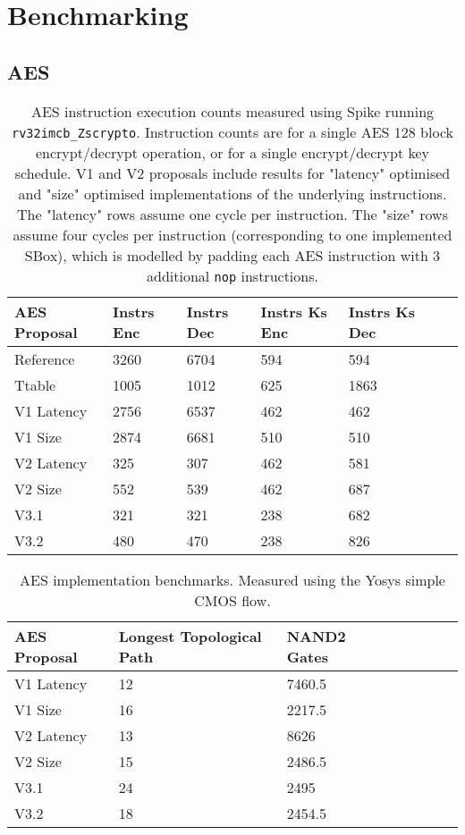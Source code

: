 
\section{Benchmarking}

\subsection{AES}
\label{sec:benchmark:aes}

\begin{table}[h]
\centering
\begin{tabular}{lllllll}
AES Proposal & Instrs Enc & Instrs Dec & Instrs Ks Enc & Instrs Ks Dec \\ \hline
Reference   & 3260  & 6704  & 594  &  594    \\
Ttable      & 1005  & 1012  & 625  &  1863   \\
V1 Latency  & 2756  & 6537  & 462  &  462    \\
V1 Size     & 2874  & 6681  & 510  &  510    \\
V2 Latency  & 325   & 307   & 462  &  581    \\
V2 Size     & 552   & 539   & 462  &  687    \\
V3.1        & 321   & 321   & 238  &  682    \\
V3.2        & 480   & 470   & 238  &  826    \\
\end{tabular}
\caption{
AES instruction execution counts measured using Spike
running {\tt rv32imcb\_Zscrypto}.
Instruction counts are for a single AES 128 block encrypt/decrypt operation,
or for a single encrypt/decrypt key schedule.
V1 and V2 proposals include results for "latency" optimised and "size"
optimised implementations of the underlying instructions.
The "latency" rows assume one cycle per instruction.
The "size" rows assume four cycles per instruction (corresponding to
one implemented SBox), which is modelled by padding each AES instruction
with 3 additional {\tt nop} instructions.
}
\label{tab:benchmarks:aes:perf}
\end{table}


\begin{table}[h]
\centering
\begin{tabular}{llllllll}
AES Proposal & Longest Topological Path & NAND2 Gates   \\ \hline
V1 Latency   & 12                       & 7460.5        \\
V1 Size      & 16                       & 2217.5        \\
V2 Latency   & 13                       & 8626          \\
V2 Size      & 15                       & 2486.5        \\
V3.1         & 24                       & 2495          \\
V3.2         & 18                       & 2454.5        \\
\end{tabular}
\caption{
AES implementation benchmarks.
Measured using the Yosys simple CMOS flow.
}
\label{tab:benchmarks:aes:impl}
\end{table}


